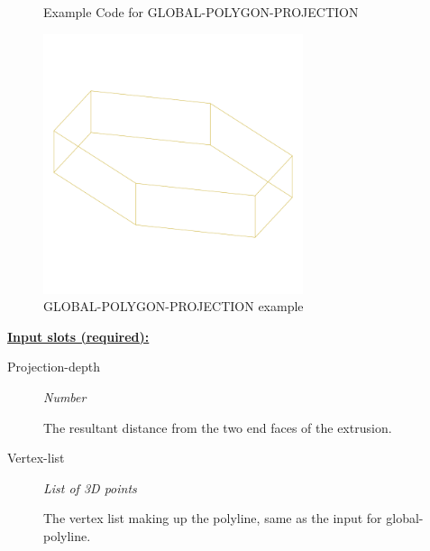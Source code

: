 \documentclass [11pt]{book}
\begin{document}
\begin{itemize}
\begin{figure}
\caption{Example Code for GLOBAL-POLYGON-PROJECTION}

\label{fig:example-code-GLOBAL-POLYGON-PROJECTION}

\end{figure}

\begin{figure}
\begin{center}
\includegraphics[width=3in,height=3in]{../images/example-GLOBAL-POLYGON-PROJECTION.pdf}
\end{center}

\caption{GLOBAL-POLYGON-PROJECTION example}

\label{fig:GLOBAL-POLYGON-PROJECTION}

\end{figure}





\textbf{
\underline{Input slots (required):}}

\begin{description}

\item [Projection-depth]
\emph{Number}

 The resultant distance from the two end faces of the extrusion.




\item [Vertex-list]
\emph{List of 3D points}

 The vertex list making up the polyline, same as the input for global-polyline.




\end{description}







\end{itemize}
\end{document}
